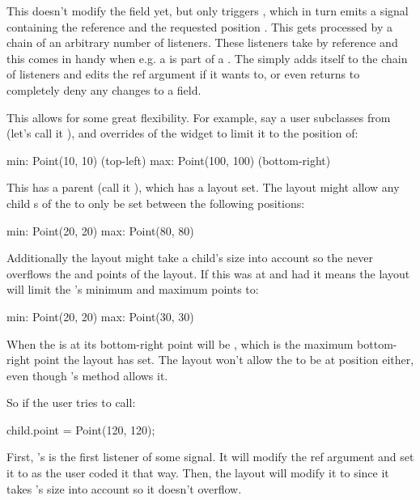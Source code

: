 This doesn't modify the field yet, but only triggers , which in turn emits a signal containing the  reference and the requested position . This gets processed by a chain of an arbitrary number of listeners. These listeners take  by reference and this comes in handy when e.g. a  is part of a . The  simply adds itself to the chain of listeners and edits the ref argument if it wants to, or even returns  to completely deny any changes to a field.

This allows for some great flexibility. For example, say a user subclasses from  (let's call it ), and overrides  of the widget to limit it to the position of:

\begin{dcode}
min: Point(10, 10) (top-left)
max: Point(100, 100) (bottom-right)
\end{dcode}

This  has a parent  (call it ), which has a layout set. The layout might allow any child s of the  to only be set between the following positions:

\begin{dcode}
min: Point(20, 20)
max: Point(80, 80)
\end{dcode}

Additionally the layout might take a child's size into account so the  never overflows the  and  points of the layout. If this  was at  and had  it means the layout will limit the 's minimum and maximum points to:

\begin{dcode}
min: Point(20, 20)
max: Point(30, 30)
\end{dcode}

When the  is at  its bottom-right point will be , which is the maximum bottom-right point the layout has set. The layout won't allow the  to be at position  either, even though 's  method allows it.

So if the user tries to call:

\begin{dcode}
child.point = Point(120, 120);
\end{dcode}

First, 's  is the first listener of some  signal. It will modify the ref argument and set it to  as the user coded it that way. Then, the layout will modify it to  since it takes 's size into account so it doesn't overflow.

